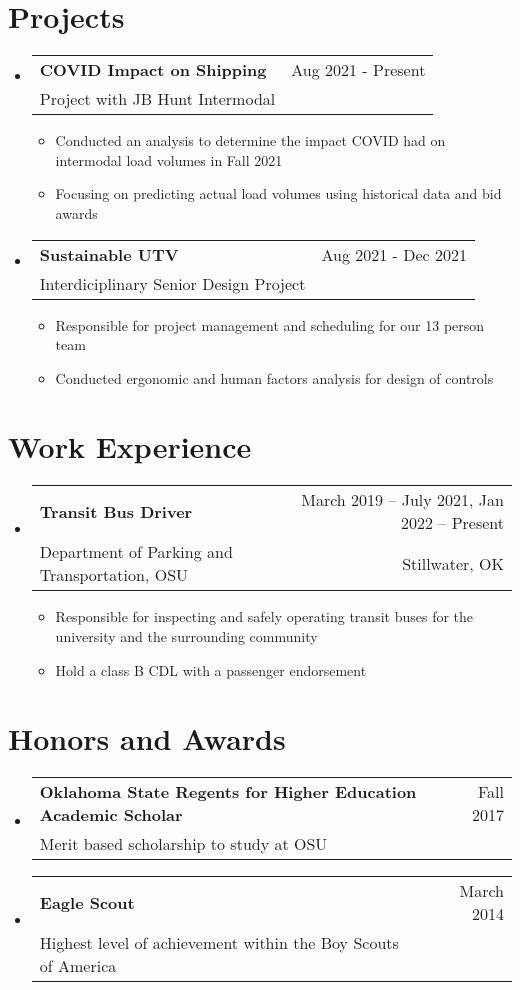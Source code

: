 \documentclass[letterpaper,12pt]{article} %
\makeatletter
\newcommand{\CVItem}[1]{
  \item\small{
    {#1 \vspace{-2pt}}
  }
}
\newcommand{\CVSubheading}[4]{
  \vspace{-2pt}\item
    \begin{tabular*}{0.97\textwidth}[t]{l@{\extracolsep{\fill}}r}
      \textbf{#1} & #2 \\
      \small#3 & \small #4 \\
    \end{tabular*}\vspace{-7pt}
}
\newcommand{\CVSubHeadingListStart}{\begin{itemize}[leftmargin=0.5cm, label={}]}
\newcommand{\CVSubHeadingListEnd}{\end{itemize}}
\newcommand{\CVItemListStart}{\begin{itemize}}
\newcommand{\CVItemListEnd}{\end{itemize}\vspace{-5pt}}
\makeatother
\begin{document}
\section{Projects}
  \CVSubHeadingListStart
    \CVSubheading
      {COVID Impact on Shipping}{Aug 2021 - Present}
      {Project with JB Hunt Intermodal}{ }
      \CVItemListStart
        \CVItem{Conducted an analysis to determine the impact COVID had on intermodal load volumes in Fall 2021}
        \CVItem{Focusing on predicting actual load volumes using historical data and bid awards }
      \CVItemListEnd
    \CVSubheading
      {Sustainable UTV}{Aug 2021 - Dec 2021}
      {Interdiciplinary Senior Design Project}{ }
      \CVItemListStart
        \CVItem{Responsible for project management and scheduling for our 13 person team}
        \CVItem{Conducted ergonomic and human factors analysis for design of controls}
      \CVItemListEnd
  \CVSubHeadingListEnd
\begin{comment}
try to briefly explain what you did and why it is relevant to the position you
are seeking
\end{comment}

\section{Work Experience}
  \CVSubHeadingListStart

    \CVSubheading
      {Transit Bus Driver}{March 2019 -- July 2021, Jan 2022 -- Present}
      {Department of Parking and Transportation, OSU}{Stillwater, OK}
      \CVItemListStart
        \CVItem{Responsible for inspecting and safely operating transit buses for the university and the surrounding community}
        \CVItem{Hold a class B CDL with a passenger endorsement}
      \CVItemListEnd
  \CVSubHeadingListEnd

\section{Honors and Awards}
  \CVSubHeadingListStart
    \CVSubheading
      {Oklahoma State Regents for Higher Education Academic Scholar}{Fall 2017}
      {Merit based scholarship to study at OSU}{}
    \CVSubheading
      {Eagle Scout}{March 2014}
      {Highest level of achievement within the Boy Scouts of America}{}
  \CVSubHeadingListEnd
\end{document}
